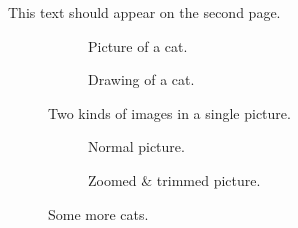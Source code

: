 This text should appear on the second page.

    \begin{figure}
        \centering
        \begin{subfigure}[b]{.5\textwidth}
            \centering
            \caption{Picture of a cat.}
        \end{subfigure}%
        \begin{subfigure}[b]{.5\textwidth}
            \centering
            \caption{Drawing of a cat.}
        \end{subfigure}
        \caption{Two kinds of images in a single picture.}
        \label{fig:cats}
    \end{figure}

    \begin{figure}
        \centering
        \begin{subfigure}[b]{.5\textwidth}
            \centering
            \caption{Normal picture.}
        \end{subfigure}%
        \begin{subfigure}[b]{.5\textwidth}
            \centering
            \caption{Zoomed \& trimmed picture.}
        \end{subfigure}
        \caption{Some more cats.}
        \label{fig:more-cats}
    \end{figure}